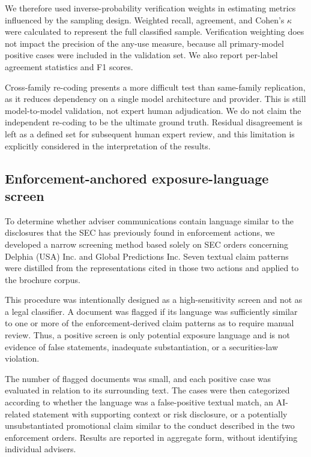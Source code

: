 \documentclass[utf8]{FrontiersinHarvard}
\begin{document}
We therefore used inverse-probability verification weights in estimating metrics influenced by the sampling design. Weighted recall, agreement, and Cohen's $\kappa$ \citep{cohen1960} were calculated to represent the full classified sample. Verification weighting does not impact the precision of the any-use measure, because all primary-model positive cases were included in the validation set. We also report per-label agreement statistics and F1 scores.

Cross-family re-coding presents a more difficult test than same-family replication, as it reduces dependency on a single model architecture and provider. This is still model-to-model validation, not expert human adjudication. We do not claim the independent re-coding to be the ultimate ground truth. Residual disagreement is left as a defined set for subsequent human expert review, and this limitation is explicitly considered in the interpretation of the results.

\subsection{Enforcement-anchored exposure-language screen}

To determine whether adviser communications contain language similar to the disclosures that the SEC has previously found in enforcement actions, we developed a narrow screening method based solely on SEC orders concerning Delphia (USA) Inc. and Global Predictions Inc. Seven textual claim patterns were distilled from the representations cited in those two actions and applied to the brochure corpus.

This procedure was intentionally designed as a high-sensitivity screen and not as a legal classifier. A document was flagged if its language was sufficiently similar to one or more of the enforcement-derived claim patterns as to require manual review. Thus, a positive screen is only potential exposure language and is not evidence of false statements, inadequate substantiation, or a securities-law violation.

The number of flagged documents was small, and each positive case was evaluated in relation to its surrounding text. The cases were then categorized according to whether the language was a false-positive textual match, an AI-related statement with supporting context or risk disclosure, or a potentially unsubstantiated promotional claim similar to the conduct described in the two enforcement orders. Results are reported in aggregate form, without identifying individual advisers.
\end{document}
